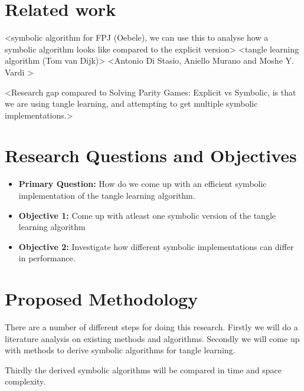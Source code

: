 \documentclass[11pt, a4paper]{article}
\begin{document}
\section{Related work}
\label{sec:relwork}

<symbolic algorithm for FPJ (Oebele), we can use this to analyse how a symbolic algorithm looks like compared to the explicit version>
<tangle learning algorithm (Tom van Dijk)>
<Antonio Di Stasio, Aniello Murano and Moshe Y. Vardi >

<Research gap compared to Solving Parity Games: Explicit vs Symbolic, is that we are using tangle learning, and attempting to get multiple symbolic implementations.>

\section{Research Questions and Objectives}
\label{sec:objectives}
\begin{itemize}

    \item \textbf{Primary Question:} How do we come up with an efficient symbolic implementation of the tangle learning algorithm.
    \item \textbf{Objective 1:} Come up with atleast one symbolic version of the tangle learning algorithm
    \item \textbf{Objective 2:} Investigate how different symbolic implementations can differ in performance.
\end{itemize}

\section{Proposed Methodology}
\label{sec:methodology}
There are a number of different steps for doing this research.
Firstly we will do a literature analysis on existing methods and algorithms.
Secondly we will come up with methods to derive symbolic algorithms for tangle learning.

Thirdly the derived symbolic algorithms will be compared in time and space complexity.
\end{document}
